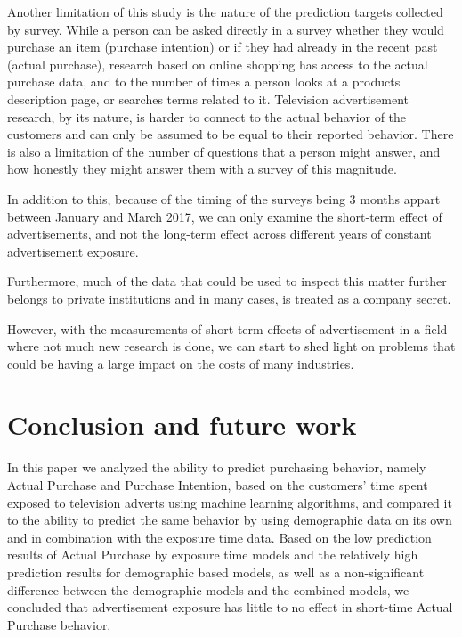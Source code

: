 \documentclass[review]{elsarticle}
\begin{document}
Another limitation of this study is the nature of the prediction targets collected by survey. While a person can be asked directly in a survey whether they would purchase an item (purchase intention) or if they had already in the recent past (actual purchase), research based on online shopping has access to the actual purchase data, and to the number of times a person looks at a products description page, or searches terms related to it. Television advertisement research, by its nature, is harder to connect to the actual behavior of the customers and can only be assumed to be equal to their reported behavior. There is also a limitation of the number of questions that a person might answer, and how honestly they might answer them with a survey of this magnitude.

In addition to this, because of the timing of the surveys being 3 months appart between January and March 2017, we can only examine the short-term effect of advertisements, and not the long-term effect across different years of constant advertisement exposure.

Furthermore, much of the data that could be used to inspect this matter further belongs to private institutions and in many cases, is treated as a company secret. 

However, with the measurements of short-term effects of advertisement in a field where not much new research is done, we can start to shed light on problems that could be having a large impact on the costs of many industries.

\section{Conclusion and future work}
\label{conclusion}

In this paper we analyzed the ability to predict purchasing behavior, namely Actual Purchase and Purchase Intention, based on the customers' time spent exposed to television adverts using machine learning algorithms, and compared it to the ability to predict the same behavior by using demographic data on its own and in combination with the exposure time data. Based on the low prediction results of Actual Purchase by exposure time models and the relatively high prediction results for demographic based models, as well as a non-significant difference between the demographic models and the combined models, we concluded that advertisement exposure has little to no effect in short-time Actual Purchase behavior. 
\end{document}
